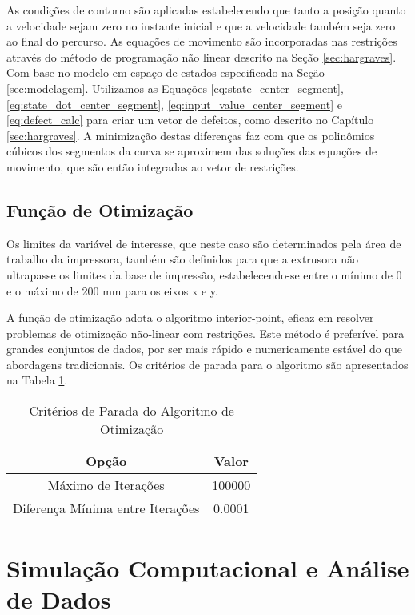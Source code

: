 As condições de contorno são aplicadas estabelecendo que tanto a posição quanto a velocidade sejam zero no instante inicial e que a velocidade também seja zero ao final do percurso. As equações de movimento são incorporadas nas restrições através do método de programação não linear descrito na Seção \ref{sec:hargraves}. Com base no modelo em espaço de estados especificado na Seção \ref{sec:modelagem}. Utilizamos as Equações \ref{eq:state_center_segment}, \ref{eq:state_dot_center_segment}, \ref{eq:input_value_center_segment} e \ref{eq:defect_calc} para criar um vetor de defeitos, como descrito no Capítulo \ref{sec:hargraves}. A minimização destas diferenças faz com que os polinômios cúbicos dos segmentos da curva se aproximem das soluções das equações de movimento, que são então integradas ao vetor de restrições.

\subsection{Função de Otimização}

Os limites da variável de interesse, que neste caso são determinados pela área de trabalho da impressora, também são definidos para que a extrusora não ultrapasse os limites da base de impressão, estabelecendo-se entre o mínimo de 0 e o máximo de 200 mm para os eixos x e y.

A função de otimização adota o algoritmo interior-point, eficaz em resolver problemas de otimização não-linear com restrições. Este método é preferível para grandes conjuntos de dados, por ser mais rápido e numericamente estável do que abordagens tradicionais. Os critérios de parada para o algoritmo são apresentados na Tabela \ref{tab:stop_crit}.

\begin{table}[H]
    \centering
    \caption{Critérios de Parada do Algoritmo de Otimização}
    \label{tab:stop_crit}
    \begin{tabular}{c c}
        Opção & Valor \\ \hline
        Máximo de Iterações & 100000 \\
        Diferença Mínima entre Iterações & 0.0001 \\ \hline
    \end{tabular}
\end{table}

\section{Simulação Computacional e Análise de Dados}

